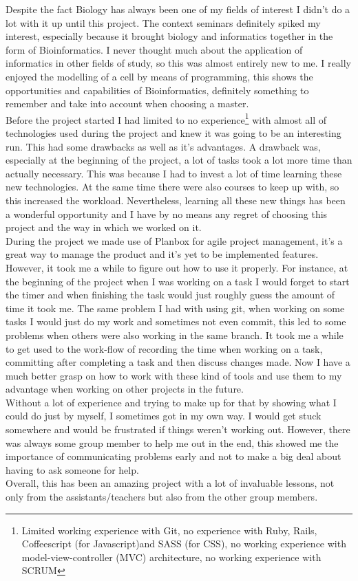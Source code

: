 Despite the fact Biology has always been one of my fields of interest I didn't do a lot with it up until this project. The context seminars definitely spiked my interest, especially because it brought biology and informatics together in the form of Bioinformatics. I never thought much about the application of informatics in other fields of study, so this was almost entirely new to me. I really enjoyed the modelling of a cell by means of programming, this shows the opportunities and capabilities of Bioinformatics, definitely something to remember and take into account when choosing a master.\\

Before the project started I had limited to no experience\footnote{Limited working experience with Git, no experience with Ruby, Rails, Coffeescript (for Javascript)and SASS (for CSS), no working experience with model-view-controller (MVC) architecture, no working experience with SCRUM} with almost all of technologies used during the project and knew it was going to be an interesting run. This had some drawbacks as well as it's advantages. A drawback was, especially at the beginning of the project, a lot of tasks took a lot more time than actually necessary. This was because I had to invest a lot of time learning these new technologies. At the same time there were also courses to keep up with, so this increased the workload. Nevertheless, learning all these new things has been a wonderful opportunity and I have by no means any regret of choosing this project and the way in which we worked on it.\\

During the project we made use of Planbox for agile project management, it's a great way to  manage the product and it's yet to be implemented features. However, it took me a while to figure out how to use it properly. For instance, at the beginning of the project when I was working on a task I would forget to start the timer and when finishing the task would just roughly guess the amount of time it took me. The same problem I had with using git, when working on some tasks I would just do my work and sometimes not even commit, this led to some problems when others were also working in the same branch. It took me a while to get used to the work-flow of recording the time when working on a task, committing after completing a task and then discuss changes made. Now I have a much better grasp on how to work with these kind of tools and use them to my advantage when working on other projects in the future.\\

Without a lot of experience and trying to make up for that by showing what I could do just by myself, I sometimes got in my own way. I would get stuck somewhere and would be frustrated if things weren't working out. However, there was always some group member to help me out in the end, this showed me the importance of communicating problems early and not to make a big deal about having to ask someone for help.\\

Overall, this has been an amazing project with a lot of invaluable lessons, not only from the assistants/teachers but also from the other group members.\\
